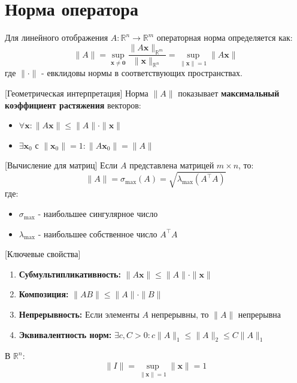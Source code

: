 \section{Норма оператора}

\begin{definition}
Для линейного отображения \(A: \mathbb{R}^n \to \mathbb{R}^m\) операторная норма определяется как:
\[
\|A\| = \sup_{\mathbf{x} \neq \mathbf{0}} \frac{\|A\mathbf{x}\|_{\mathbb{R}^m}}{\|\mathbf{x}\|_{\mathbb{R}^n}} = \sup_{\|\mathbf{x}\| = 1} \|A\mathbf{x}\|
\]
где \(\|\cdot\|\) - евклидовы нормы в соответствующих пространствах.
\end{definition}

[Геометрическая интерпретация]
Норма \(\|A\|\) показывает \textbf{максимальный коэффициент растяжения} векторов:
\begin{itemize}
\item \(\forall \mathbf{x}: \|A\mathbf{x}\| \leqslant \|A\| \cdot \|\mathbf{x}\|\)
\item \(\exists \mathbf{x}_0 \text{ с } \|\mathbf{x}_0\|=1: \|A\mathbf{x}_0\| = \|A\|\)
\end{itemize}

[Вычисление для матриц]
Если \(A\) представлена матрицей \(m \times n\), то:
\[
\|A\| = \sigma_{\max}(A) = \sqrt{\lambda_{\max}(A^\top A)}
\]
где:
\begin{itemize}
\item \(\sigma_{\max}\) - наибольшее сингулярное число
\item \(\lambda_{\max}\) - наибольшее собственное число \(A^\top A\)
\end{itemize}

[Ключевые свойства]
\begin{enumerate}
\item \textbf{Субмультипликативность:} 
  \(\|A\mathbf{x}\| \leqslant \|A\| \cdot \|\mathbf{x}\|\)
  
\item \textbf{Композиция:} 
  \(\|A B\| \leqslant \|A\| \cdot \|B\|\)
  
\item \textbf{Непрерывность:} 
  Если элементы \(A\) непрерывны, то \(\|A\|\) непрерывна
  
\item \textbf{Эквивалентность норм:} 
  \(\exists c,C > 0: c\|A\|_1 \leqslant \|A\|_2 \leqslant C\|A\|_1\)
\end{enumerate}


\begin{example}
В \(\mathbb{R}^n\):
\[
\|I\| = \sup_{\|\mathbf{x}\|=1} \|\mathbf{x}\| = 1
\]
\end{example}

